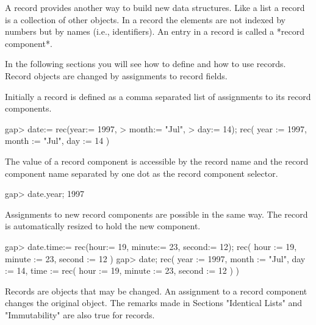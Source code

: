 


A record provides another way to  build new data structures.  Like a list
a record is a collection of other  objects.  In a record the elements are
not indexed by numbers but by  names (i.e., identifiers).   An entry in a
record is called a *record component*.

In  the following sections  you  will see how to  define  and how to  use
records.  Record objects are changed by assignments to record fields.


Initially a record is defined as a comma separated list of assignments to
its record components.

\beginexample
    gap> date:= rec(year:= 1997,
    >               month:= "Jul",
    >               day:= 14);
    rec(
      year := 1997,
      month := "Jul",
      day := 14 )
\endexample

The value of a record component is accessible by  the record name and the
record  component name separated   by one dot   as  the record  component
selector.

\beginexample
    gap> date.year;
    1997
\endexample

Assignments to new record components  are possible in  the same way.  The
record is automatically resized to hold the new component.

\beginexample
    gap> date.time:= rec(hour:= 19, minute:= 23, second:= 12);
    rec(
      hour := 19,
      minute := 23,
      second := 12 )
    gap> date;
    rec(
      year := 1997,
      month := "Jul",
      day := 14,
      time := rec(
          hour := 19,
          minute := 23,
          second := 12 ) )
\endexample

Records are objects  that  may be  changed.   An assignment to  a  record
component  changes the original  object.    The remarks made in  Sections
"Identical Lists" and "Immutability" are also true for records.

